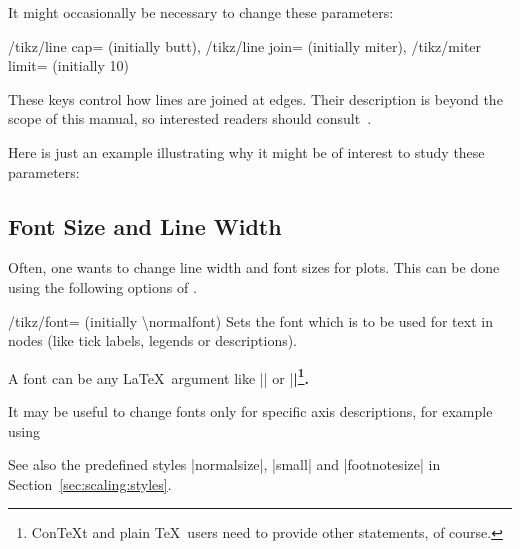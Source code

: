It might occasionally be necessary to change these parameters:

\begin{keylist}{%
	/tikz/line cap= (initially butt),%
	/tikz/line join= (initially miter),%
	/tikz/miter limit= (initially 10)}%
	
	These keys control how lines are joined at edges. Their description is beyond the scope of this manual, so interested readers should consult~\cite{tikz}.

	Here is just an example illustrating why it might be of interest to study these parameters:
\begin{codeexample}[]
\end{codeexample}
\end{keylist}


\subsection{Font Size and Line Width}
Often, one wants to change line width and font sizes for plots. This can be done using the following options of \Tikz.

\begin{key}{/tikz/font= (initially \textbackslash normalfont)}
	Sets the font which is to be used for text in nodes (like tick labels, legends or descriptions).

	A font can be any \LaTeX\ argument like |\footnotesize| or |\small\bfseries|\footnote{Con\TeX t and plain \TeX\ users need to provide other statements, of course.}.

	It may be useful to change fonts only for specific axis descriptions, for example using
\begin{codeexample}
\end{codeexample}

	See also the predefined styles |normalsize|, |small| and |footnotesize| in Section~\ref{sec:scaling:styles}.
\end{key}

